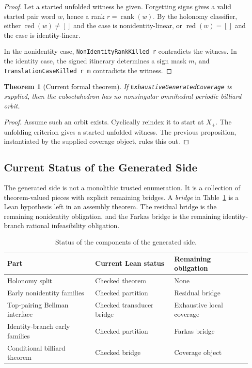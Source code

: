 \documentclass[11pt]{article}
\newtheorem{theorem}{Theorem}
\newcommand{\rank}{\operatorname{rank}}
\newcommand{\red}{\operatorname{red}}
\begin{document}
\begin{proof}
Let a started unfolded witness be given.  Forgetting signs gives a valid
started pair word \(w\), hence a rank \(r=\rank(w)\).  By the holonomy
classifier, either \(\red(w)\ne[]\) and the case is nonidentity-linear, or
\(\red(w)=[]\) and the case is identity-linear.

In the nonidentity case, \texttt{NonIdentityRankKilled r} contradicts the
witness.  In the identity case, the signed itinerary determines a sign mask
\(m\), and \texttt{TranslationCaseKilled r m} contradicts the witness.
\end{proof}

\begin{theorem}[Current formal theorem]
If \texttt{ExhaustiveGeneratedCoverage} is supplied, then the
cuboctahedron has no nonsingular omnihedral periodic billiard orbit.
\end{theorem}

\begin{proof}
Assume such an orbit exists.  Cyclically reindex it to start at \(X_+\).  The
unfolding criterion gives a started unfolded witness.  The previous
proposition, instantiated by the supplied coverage object, rules this out.
\end{proof}

\subsection{Current Status of the Generated Side}

The generated side is not a monolithic trusted enumeration.  It is a
collection of theorem-valued pieces with explicit remaining bridges.  A
\emph{bridge} in Table~\ref{tab:status} is a Lean hypothesis left in an
assembly theorem.  The residual bridge is the remaining nonidentity
obligation, and the Farkas bridge is the remaining identity-branch rational
infeasibility obligation.

\begin{table}[ht]
\centering
\begin{tabular}{@{}lll@{}}
\toprule
Part & Current Lean status & Remaining obligation \\
\midrule
Holonomy split & Checked theorem & None \\
Early nonidentity families & Checked partition & Residual bridge \\
Top-pairing Bellman interface & Checked transducer bridge & Exhaustive local coverage \\
Identity-branch early families & Checked partition & Farkas bridge \\
Conditional billiard theorem & Checked bridge & Coverage object \\
\bottomrule
\end{tabular}
\caption{Status of the components of the generated side.}
\label{tab:status}
\end{table}
\end{document}
